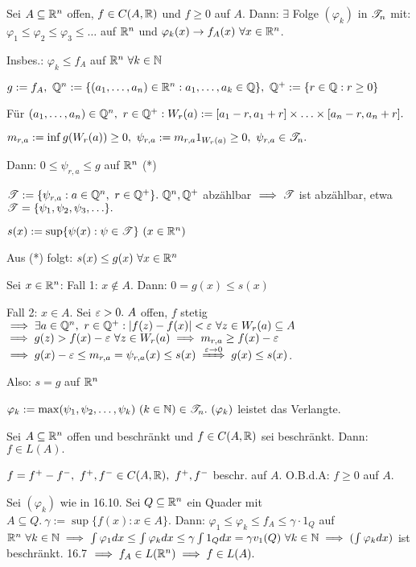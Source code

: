 \documentclass[a4paper,twoside,DIV15,BCOR12mm]{scrbook}
\begin{document}
\begin{satz}
Sei $A\subseteq\mathbb{R}^n$ offen, $f\in C(A,\mathbb{R})$ und $f\ge 0$ auf $A$. Dann: $\exists$ Folge $(\varphi_k)$ in $\mathscr{T}_n$ mit: $\varphi_1\le\varphi_2\le\varphi_3\le\ldots$ auf $\mathbb{R}^n$ und $\varphi_k(x)\to f_A(x)\ \forall x\in\mathbb{R}^n$.

Insbes.: $\varphi_k\le f_A$ auf $\mathbb{R}^n\ \forall k\in\mathbb{N}$
\end{satz}

\begin{beweis}
$g:=f_A,\ \MdQ^n:=\{(a_1,\ldots,a_n)\in\MdR^n:a_1,\ldots,a_k\in\MdQ\},\ \MdQ^+:=\{r\in\MdQ:r\ge0\}$

Für $(a_1,\ldots,a_n)\in\MdQ^n,\ r\in\MdQ^+: W_r(a):=[a_1-r,a_1+r] \times \ldots \times [a_n-r,a_n+r].$

$m_{r,a}:=\inf g(W_r(a))\ge 0,\ \psi_{r,a}:=m_{r,a}1_{W_r(a)}\ge 0,\ \psi_{r,a}\in\T_n.$

Dann: $0\le\psi_{r,a}\le g$ auf $\mathbb{R}^n$ (*)

$\T:=\{\psi_{r,a}:a\in\MdQ^n,\ r\in\MdQ^+\}.\ \MdQ^n,\MdQ^+$ abzählbar $\implies \mathscr{T}$ ist abzählbar, etwa $\mathscr{T}=\{\psi_1,\psi_2,\psi_3,\ldots\}.$

$s(x):=\sup \{\psi(x):\psi\in\T\}\ (x\in\MdR^n)$

Aus (*) folgt: $s(x)\le g(x)\ \forall x\in\mathbb{R}^n$

Sei $x\in\mathbb{R}^n$: Fall 1: $x\notin A.$ Dann: $0=g(x)\le s(x)$

Fall 2: $x\in A.$ Sei $\varepsilon>0.\ A$ offen, $f$ stetig\\
$\implies \exists a\in\mathbb{Q}^n,\ r\in\mathbb{Q}^+: |f(z)-f(x)|<\varepsilon\ \forall z\in W_r(a)\subseteq A$\\
$\implies g(z)>f(x)-\varepsilon\ \forall z\in W_r(a) \implies m_{r,a}\ge f(x)-\varepsilon$\\
$\folgt g(x )-\ep \le m_{r,a} = \psi_{r,a}(x) \le s(x) \folgtwegen{\ep\to0} g(x) \le s(x)$.

Also: $s=g$ auf $\mathbb{R}^n$

$\varphi_k:=\max(\psi_1,\psi_2,\ldots,\psi_k)\ (k\in\MdN)\in\T_n.\ (\varphi_k)$ leistet das Verlangte.
\end{beweis}

\begin{satz}
Sei $A\subseteq\mathbb{R}^n$ offen und beschränkt und $f\in C(A,\mathbb{R})$ sei beschränkt. Dann: $f\in L(A).$
\end{satz}

\begin{beweis}
$f=f^+-f^-,\ f^+,f^-\in C(A,\MdR),\ f^+,f^-$ beschr. auf $A$. O.B.d.A: $f\ge0$ auf $A$.

Sei $(\varphi_k)$ wie in 16.10. Sei $Q\subseteq\mathbb{R}^n$ ein Quader mit $A\subseteq Q.\ \gamma:=\sup\{f(x):x\in A\}.$ Dann: $\varphi_1\le\varphi_k\le f_A\le\gamma\cdot 1_Q$ auf $\mathbb{R}^n\ \forall k\in\mathbb{N}\\
\implies \int\varphi_1dx\le\int\varphi_kdx\le\gamma\int 1_Qdx=\gamma v_1(Q)\ \forall k\in\mathbb{N}\\
\implies (\int\varphi_kdx)$ ist beschränkt. 16.7 $\implies f_A\in L(\mathbb{R}^n) \implies f\in L(A).$
\end{beweis}
\end{document}
